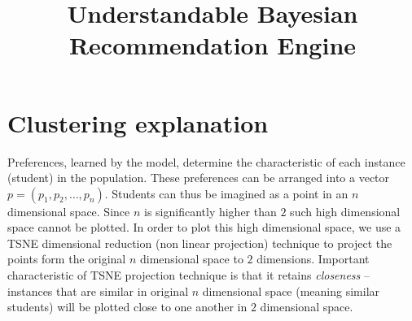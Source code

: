 \documentclass{minimal}
\title{Understandable Bayesian Recommendation Engine}
\begin{document}
    


 

\section{Clustering explanation}
Preferences, learned by the model, determine the characteristic of each instance (student) in the population. These preferences can be arranged into a vector $p = (p_1, p_2, \dots, p_n)$. Students can thus be imagined as a point in an $n$ dimensional space. Since $n$ is significantly higher than $2$ such high dimensional space cannot be plotted. In order to plot this high dimensional space, we use a TSNE dimensional reduction (non linear projection) technique to project the points form the original $n$ dimensional space to $2$ dimensions. Important characteristic of TSNE projection technique is that it retains \emph{closeness} -- instances that are similar in original $n$ dimensional space (meaning similar students) will be plotted close to one another in $2$ dimensional space.
\end{document}
